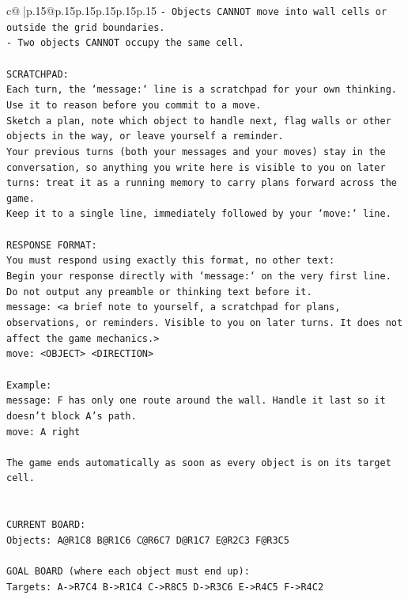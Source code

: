 \documentclass{article}
\begin{document}
{\begin{supertabular}{c@{$\;$}|p{.15\linewidth}@{}p{.15\linewidth}p{.15\linewidth}p{.15\linewidth}p{.15\linewidth}p{.15\linewidth}}
{{{\texttt{{-} Objects CANNOT move into wall cells or outside the grid boundaries.} \\
\texttt{{-} Two objects CANNOT occupy the same cell.} \\
\\ 
\texttt{SCRATCHPAD:} \\
\texttt{Each turn, the `message:` line is a scratchpad for your own thinking. Use it to reason before you commit to a move. } \\
\texttt{Sketch a plan, note which object to handle next, flag walls or other objects in the way, or leave yourself a reminder. } \\
\texttt{Your previous turns (both your messages and your moves) stay in the conversation, so anything you write here is visible to you on later turns: treat it as a running memory to carry plans forward across the game.} \\
\texttt{Keep it to a single line, immediately followed by your `move:` line.} \\
\\ 
\texttt{RESPONSE FORMAT:} \\
\texttt{You must respond using exactly this format, no other text:} \\
\texttt{Begin your response directly with `message:` on the very first line. Do not output any preamble or thinking text before it.} \\
\texttt{message: <a brief note to yourself, a scratchpad for plans, observations, or reminders. Visible to you on later turns. It does not affect the game mechanics.>} \\
\texttt{move: <OBJECT> <DIRECTION>} \\
\\ 
\texttt{Example:} \\
\texttt{message: F has only one route around the wall. Handle it last so it doesn't block A's path.} \\
\texttt{move: A right} \\
\\ 
\texttt{The game ends automatically as soon as every object is on its target cell.} \\
\\ 
\\ 
\texttt{CURRENT BOARD:} \\
\texttt{Objects: A@R1C8 B@R1C6 C@R6C7 D@R1C7 E@R2C3 F@R3C5} \\
\\ 
\texttt{GOAL BOARD (where each object must end up):} \\
\texttt{Targets: A{-}>R7C4 B{-}>R1C4 C{-}>R8C5 D{-}>R3C6 E{-}>R4C5 F{-}>R4C2} \\
            }
        }
    }
     \\ \\


\end{supertabular}}
\end{document}
